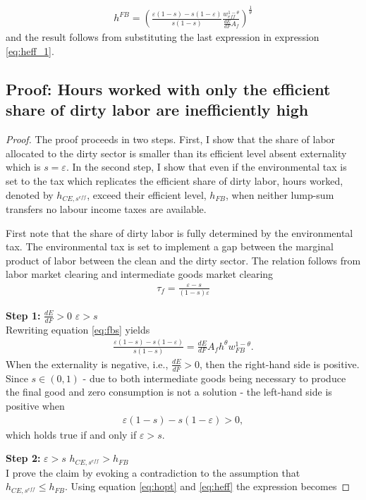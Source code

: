 \begin{align}
h^{FB}= \left(\frac{\varepsilon(1-s)-s(1-\varepsilon)}{s(1-s)}\frac{w_{eff}^{1-\theta}}{\frac{dE}{dF}A_f }\right)^\frac{1}{\theta}
\end{align}
and the result follows from substituting the last expression in expression  \ref{eq:heff_1}.

\subsection{Proof: Hours worked with only the efficient share of dirty labor are inefficiently high}

\begin{proof}
The proof proceeds in two steps. First, I show that the share of labor allocated to the dirty sector is smaller than its efficient level absent externality which is $s=\varepsilon$.
In the second step, I show that even if the environmental tax is set to the tax which replicates the efficient share of dirty labor, hours worked, denoted by $h_{CE, s^{eff}}$, exceed their efficient level, $h_{FB}$, when neither lump-sum transfers no labour income taxes are available. 

First note that the share of dirty labor is fully determined by the environmental tax. The environmental tax is set to implement a gap between the marginal product of labor between the clean and the dirty sector. The relation follows from labor market clearing and intermediate goods market clearing 
\begin{align}
\tau_f = \frac{\varepsilon-s}{(1-s)\varepsilon}\label{eq:tauf}
\end{align}

\textbf{Step 1:} $\frac{dE}{dF}>0$ \ar $\varepsilon>s$\\
Rewriting equation \ref{eq:fbs} yields
\begin{align}
\frac{\varepsilon(1-s)-s(1-\varepsilon)}{s(1-s)}=\frac{dE}{dF}A_fh^\theta w_{FB}^{1-\theta}.
\end{align}
When the externality is negative, i.e., $\frac{dE}{dF}>0$, then the right-hand side is positive.
Since $s\in(0,1)$ - due to both intermediate goods being necessary to produce the final good and zero consumption is not a solution - the left-hand side is positive when
\begin{align}
\varepsilon(1-s)-s(1-\varepsilon)>0,
\end{align}
which holds true if and only if $\varepsilon>s$.

\textbf{Step 2:} $\varepsilon>s$ \ar $h_{CE, s^{eff}}>h_{FB}$\\
I prove the claim by evoking a contradiction to the assumption that $h_{CE, s^{eff}}\leq h_{FB}$. Using equation \ref{eq:hopt} and \ref{eq:heff} the expression becomes


\end{proof}
